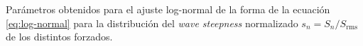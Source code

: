 \begin{landscape}
\begin{table}
\caption{Parámetros obtenidos para el ajuste log-normal de la forma de la ecuación \eqref{eq:log-normal} para la distribución del \textit{wave steepness} normalizado $s_n=S_n/S_{\text{rms}}$  de los distintos forzados. } %
\label{tab:lognormal_global}

\end{table} 


\end{landscape}
